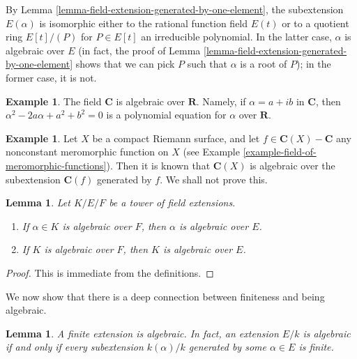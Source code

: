 \documentclass{stacks-project}
\theoremstyle{plain}
\newtheorem{lemma}[subsection]{Lemma}
\theoremstyle{definition}
\newtheorem{example}[subsection]{Example}
\theoremstyle{remark}
\numberwithin{equation}{subsection}
\begin{document}
\noindent
By Lemma \ref{lemma-field-extension-generated-by-one-element}, the
subextension $E(\alpha)$ is isomorphic either to the rational function
field $E(t)$ or to a quotient ring $E[t]/(P)$ for $P \in E[t]$ an
irreducible polynomial. In the latter case, $\alpha$ is algebraic over
$E$ (in fact, the proof of
Lemma \ref{lemma-field-extension-generated-by-one-element}
shows that we can pick $P$ such that $\alpha$ is a root of $P$);
in the former case, it is not.

\begin{example}
\label{example-C-algebraic-over-R}
The field $\mathbf{C}$ is algebraic over $\mathbf{R}$. Namely, if
$\alpha = a + ib$ in $\mathbf{C}$, then $\alpha^2 - 2a\alpha + a^2 + b^2 = 0$
is a polynomial equation for $\alpha$ over $\mathbf{R}$.
\end{example}

\begin{example}
\label{example-compact-riemann-surface-is-finite-over-P1}
Let $X$ be a compact Riemann surface, and let
$f \in \mathbf{C}(X) - \mathbf{C}$ any nonconstant meromorphic function
on $X$ (see Example \ref{example-field-of-meromorphic-functions}). Then it is
known that $\mathbf{C}(X)$ is algebraic over the subextension
$\mathbf{C}(f)$ generated by $f$. We shall not prove this.
\end{example}

\begin{lemma}
\label{lemma-algebraic-goes-up}
Let $K/E/F$ be a tower of field extensions.
\begin{enumerate}
\item If $\alpha \in K$ is algebraic over $F$, then $\alpha$ is algebraic
over $E$.
\item If $K$ is algebraic over $F$, then $K$ is algebraic over $E$.
\end{enumerate}
\end{lemma}

\begin{proof}
This is immediate from the definitions.
\end{proof}

\noindent
We now show that there is a deep connection between finiteness and being
algebraic.

\begin{lemma}
\label{lemma-finite-is-algebraic}
A finite extension is algebraic. In fact, an extension $E/k$ is algebraic
if and only if every subextension $k(\alpha)/k$ generated by some
$\alpha \in E$ is finite.
\end{lemma}
\end{document}
